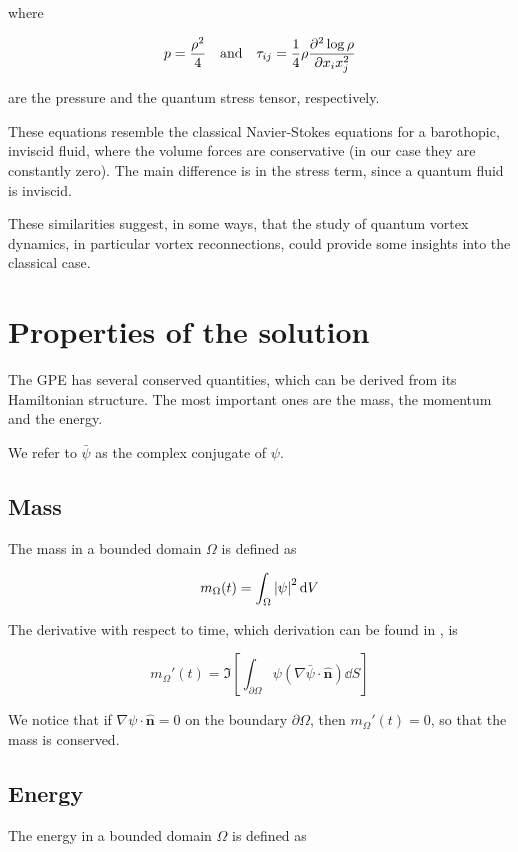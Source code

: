 where 

\[
    p = \frac{\rho^2}{4} \quad \text{and} \quad \tau_{ij} = \frac14 \rho \frac{\partial^{2} \log \rho}{\partial x_i x_j^{2}}
\]

are the pressure and the quantum stress tensor, respectively. 

These equations resemble the classical Navier-Stokes equations for a barothopic, inviscid fluid, where the volume forces are conservative (in our case they are constantly zero). The main difference is in the stress term, since a quantum fluid is inviscid. 

These similarities suggest, in some ways, that the study of quantum vortex dynamics, in particular vortex reconnections, could provide some insights into the classical case.

\section{Properties of the solution}

The GPE has several conserved quantities, which can be derived from its Hamiltonian structure. The most important ones are the mass, the momentum and the energy.

We refer to $\bar{\psi}$ as the complex conjugate of $\psi$.

\subsection{Mass}
The mass in a bounded domain $\Omega$ is defined as

\begin{equation}
    m_\Omega(t) = \int_\Omega \left| \psi \right|^2 \mathrm{d} V
    \label{eq:mass}
\end{equation}

The derivative with respect to time, which derivation can be found in \cite{CZ21}, is

\[m_\Omega'(t) = \Im\left[ \int_{\partial \Omega} \psi\left(\nabla \bar{\psi} \cdot \hat{\mathbf{n}}\right) \dd S \right] \] 

We notice that if $\nabla\psi \cdot \hat{\mathbf{n}} = 0$ on the boundary $\partial \Omega$, then $m_\Omega'(t) = 0$, so that the mass is conserved.

\subsection{Energy}

The energy in a bounded domain $\Omega$ is defined as

